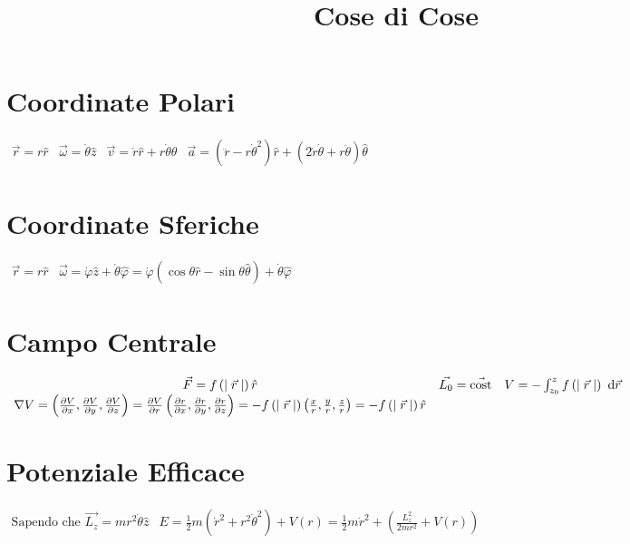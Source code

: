 \documentclass[a4paper,NoNotes,GeneralMath,12pt]{stdmdoc}
\newcommand\cost{\text{cost}}
\begin{document}
	\title{Cose di Cose}
	
	\section*{Coordinate Polari}
	$\begin{array}{cccc} \vec{r} = r\hat{r} & \vec{\omega} = \dot{\theta} \hat{z} & \vec{v} = \dot{r}\hat{r} + r\dot{\theta}\hat{\theta} & \vec{a} = \left(\ddot{r} - r{\dot{\theta}}^2\right)\hat{r} + \left(2\dot{r}\dot{\theta} + r\ddot{\theta}\right)\hat{\theta} \end{array}$

	\section*{Coordinate Sferiche}
	$\begin{array}{cc} \vec{r} = r\hat{r} & \vec{\omega} = \dot\varphi \hat{z} + \dot\theta \hat\varphi = \dot{\varphi} \left(\cos\theta \hat{r} - \sin\theta \hat{\theta}\right) + \dot{\theta} \hat{\varphi} \end{array}$

	\section*{Campo Centrale}
	$\begin{array}{ccc} \vec{F} = f\left(\mid \vec{r} \mid\right) \hat{r} & \vec{L_0} = \vec{\cost} & V = - \int_{z_0}^{z} f\left(\mid \vec{r} \mid\right) \de{\vec{r}} \\ \nabla V = \left(\dpar{V}{x}, \dpar{V}{y}, \dpar{V}{z}\right) = \dpar{V}{r} \left(\dpar{r}{x}, \dpar{r}{y}, \dpar{r}{z}\right) = - f\left(\mid \vec{r} \mid\right) \left(\frac{x}{r}, \frac{y}{r}, \frac{z}{r}\right) = - f\left(\mid \vec{r} \mid \right) \hat{r} \end{array}$

	\section*{Potenziale Efficace}
	$\begin{array}{cc} \text{Sapendo che } \vec{L_z} = mr^2 \dot{\theta} \hat{z} & E = \frac{1}{2} m\left({\dot{r}}^2 + r^2 {\dot{\theta}}^2\right) + V\left(r\right) = \frac{1}{2} m {\dot{r}}^2 + \left(\frac{L_z^2}{2mr^2} + V\left(r\right)\right) \end{array}$
\end{document}
